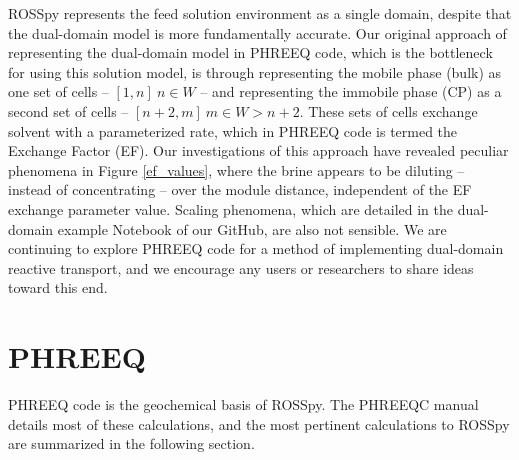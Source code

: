 \documentclass[fleqn,10pt]{wlscirep}
\begin{document}
ROSSpy represents the feed solution environment as a single domain, despite that the dual-domain model is more fundamentally accurate. Our original approach of representing the dual-domain model in PHREEQ code, which is the bottleneck for using this solution model, is through representing the mobile phase (bulk) as  one set of cells -- $[1,n]~n\in W$ -- and representing the immobile phase (CP) as a second set of cells -- $[n+2,m]~m \in W>n+2$. These sets of cells exchange solvent with a parameterized rate, which in PHREEQ code is termed the Exchange Factor (EF). Our investigations of this approach have revealed peculiar phenomena in Figure \ref{ef_values}, where the brine appears to be diluting -- instead of concentrating -- over the module distance, independent of the EF exchange parameter value. Scaling phenomena, which are detailed in the dual-domain example Notebook of our GitHub, are also not sensible. We are continuing to explore PHREEQ code for a method of implementing dual-domain reactive transport, and we encourage any users or researchers to share ideas toward this end.

\section{PHREEQ}
PHREEQ code is the geochemical basis of ROSSpy. The PHREEQC manual details most of these calculations, and the most pertinent calculations to ROSSpy are summarized in the following section.
\end{document}
